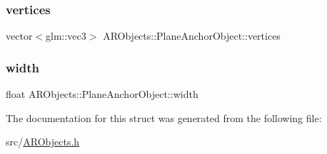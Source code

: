 \subsubsection{\texorpdfstring{vertices}{vertices}}
{\footnotesize\ttfamily vector$<$glm\+::vec3$>$ A\+R\+Objects\+::\+Plane\+Anchor\+Object\+::vertices}

\mbox{\label{struct_a_r_objects_1_1_plane_anchor_object_a66571f63611c3fe8c8161c18b5d163cc}} 
\subsubsection{\texorpdfstring{width}{width}}
{\footnotesize\ttfamily float A\+R\+Objects\+::\+Plane\+Anchor\+Object\+::width}



The documentation for this struct was generated from the following file\+:\begin{DoxyCompactItemize}
\item 
src/\mbox{\hyperlink{_a_r_objects_8h}{A\+R\+Objects.\+h}}\end{DoxyCompactItemize}
